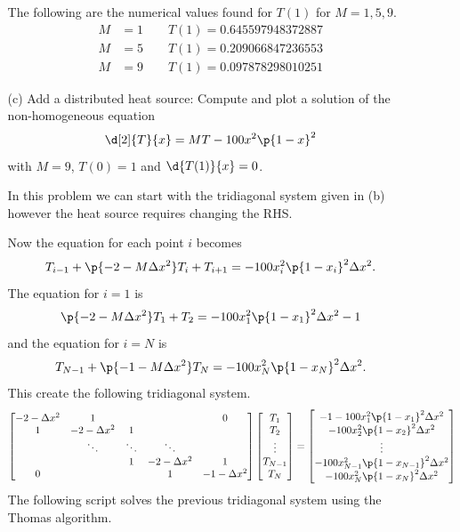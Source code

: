 \documentclass[11pt, oneside]{article}
\begin{document}
\begin{enumerate}
\begin{enumerate}
\begin{center}
        \end{center}
        The following are the numerical values found for $T(1)$ for
        $M = 1, 5, 9$.
        \begin{align*}
          M &= 1 \qquad T(1) = 0.645597948372887 \\
          M &= 5 \qquad T(1) = 0.209066847236553 \\
          M &= 9 \qquad T(1) = 0.097878298010251
        \end{align*}

      \item[(c)]
        Add a distributed heat source: Compute and plot a solution of the
        non-homogeneous equation
        \[
          \d[2]{T}{x} = MT - 100 x^2 \p{1 - x}^2
        \]
        with $M = 9$, $T(0) = 1$ and $\d{T(1)}{x} = 0$.

        In this problem we can start with the tridiagonal system given in (b)
        however the heat source requires changing the RHS.\

        Now the equation for each point $i$ becomes
        \[
          T_{i - 1} + \p{- 2 - M\Delta x^2}T_i + T_{i+1} = -100x_i^2 \p{1 - x_i}^2 \Delta x^2.
        \]
        The equation for $i = 1$ is
        \[
         \p{- 2 - M\Delta x^2}T_1 + T_2 = -100x_1^2 \p{1 - x_1}^2 \Delta x^2 - 1
        \]
        and the equation for $i = N$ is
        \[
          T_{N - 1} + \p{-1 - M\Delta x^2}T_N = -100x_N^2 \p{1 - x_N}^2 \Delta x^2.
        \]
        This create the following tridiagonal system.
        \[
          \begin{bmatrix}
            -2 - \Delta x^2 & 1 & & & 0 \\
            1 & -2 - \Delta x^2 & 1 &  \\
             & \ddots & \ddots & \ddots &  \\
             &  & 1 & -2 - \Delta x^2  & 1  \\
            0 &  &  & 1 & -1 - \Delta x^2
          \end{bmatrix}
          \begin{bmatrix}
            T_1 \\
            T_2 \\
            \vdots \\
            T_{N - 1} \\
            T_{N}
          \end{bmatrix}
          =
          \begin{bmatrix}
            -1 - 100x_1^2 \p{1 - x_1}^2 \Delta x^2 \\
            -100x_2^2 \p{1 - x_2}^2 \Delta x^2\\
            \vdots \\
            -100x_{N-1}^2 \p{1 - x_{N-1}}^2 \Delta x^2\\
            -100x_N^2 \p{1 - x_N}^2 \Delta x^2
          \end{bmatrix}
        \]
        The following script solves the previous tridiagonal system using the
        Thomas algorithm.
        


\end{enumerate}
\end{enumerate}
\end{document}
